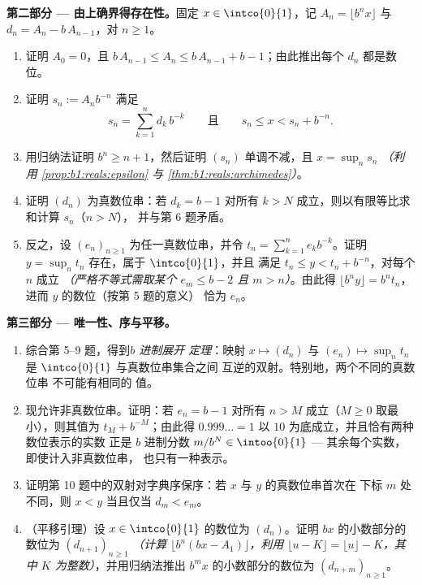 \begin{problem}
\medskip
\noindent\textbf{第二部分 --- 由上确界得存在性。}固定
$x \in \intco{0}{1}$，记 $A_n = \lfloor b^n x \rfloor$ 与
$d_n = A_n - b\,A_{n-1}$，对 $n \geq 1$。
\begin{enumerate}[resume]
  \item 证明 $A_0 = 0$，且 $b\,A_{n-1} \leq A_n \leq b\,A_{n-1} +
        b - 1$；由此推出每个 $d_n$ 都是数位。
  \item 证明 $s_n := A_n b^{-n}$ 满足
        \[
        s_n = \sum_{k=1}^{n} d_k\,b^{-k}
        \qquad\text{且}\qquad
        s_n \leq x < s_n + b^{-n} .
        \]
  \item 用归纳法证明 $b^n \geq n + 1$，然后证明
        $(s_n)$ 单调不减，且 $x = \sup_n s_n$
        \emph{（利用 \cref{prop:b1:reals:epsilon} 与
        \cref{thm:b1:reals:archimedes}）}。
  \item 证明 $(d_n)$ 为真数位串：若 $d_k = b - 1$
        对所有 $k > N$ 成立，则以有限等比求和计算 $s_n$（$n > N$），
        并与第 6 题矛盾。
  \item 反之，设 $(e_n)_{n \geq 1}$ 为任一真数位串，并令
        $t_n = \sum_{k=1}^n e_k b^{-k}$。证明 $y
        = \sup_n t_n$ 存在，属于 $\intco{0}{1}$，并且
        满足 $t_n \leq y < t_n + b^{-n}$，对每个 $n$ 成立
        \emph{（严格不等式需取某个 $e_m \leq b
        - 2$ 且 $m > n$）}。由此得 $\lfloor b^n y \rfloor = b^n
        t_n$，进而 $y$ 的数位（按第 5 题的意义）
        恰为 $e_n$。
\end{enumerate}

\medskip
\noindent\textbf{第三部分 --- 唯一性、序与平移。}
\begin{enumerate}[resume]
  \item 综合第 5--9 题，得到\emph{$b$ 进制展开
        定理}：映射 $x \mapsto (d_n)$ 与 $(e_n) \mapsto
        \sup_n t_n$ 是 $\intco{0}{1}$ 与真数位串集合之间
        互逆的双射。特别地，两个不同的真数位串
        不可能有相同的
        值。
  \item 现允许非真数位串。证明：若 $e_n
        = b - 1$ 对所有 $n > M$ 成立（$M \geq 0$ 取最小），则其值为
        $t_M + b^{-M}$；由此得 $0.999\dots = 1$ 以
        $10$ 为底成立，并且恰有两种数位表示的实数
        正是 $b$ 进制分数
        $m/b^N \in \intoo{0}{1}$ --- 其余每个实数，即使计入非真数位串，
        也只有一种表示。
  \item 证明第 10 题中的双射对字典序保序：若
        $x$ 与 $y$ 的真数位串首次在
        下标 $m$ 处不同，则
        $x < y$ 当且仅当 $d_m < e_m$。
  \item （平移引理）设 $x \in \intco{0}{1}$ 的数位为
        $(d_n)$。证明 $bx$ 的小数部分的数位为
        $(d_{n+1})_{n \geq 1}$ \emph{（计算 $\lfloor b^n(bx -
        A_1)\rfloor$，利用 $\lfloor u - K \rfloor = \lfloor u
        \rfloor - K$，其中 $K$ 为整数）}，并用归纳法推出
        $b^m x$ 的小数部分的数位为
        $(d_{n+m})_{n \geq 1}$。
\end{enumerate}


\end{problem}
